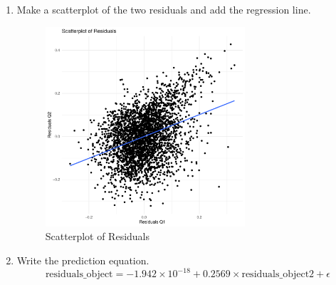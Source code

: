 \documentclass[12pt,letterpaper]{article}
\begin{document}
\begin{enumerate}
													 
													\newpage
		\item Make a scatterplot of the two residuals and add the regression line. 
			\begin{figure}[H]
			\centering
			\includegraphics[width=0.7\textwidth]{ScatterPlot4.pdf}  %
			\caption{Scatterplot of Residuals}
			\label{fig:pdf}
				 
		\end{figure}
		\item Write the prediction equation.
\[
\text{residuals\_object} = -1.942 \times 10^{-18} + 0.2569 \times \text{residuals\_object2} + \epsilon
\]
	
		
	\end{enumerate}
	
	\newpage	
\end{document}
